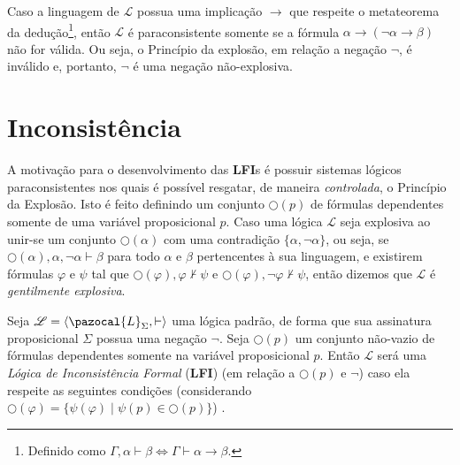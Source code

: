Caso a linguagem de $\mathcal{L}$ possua uma implicação $\rightarrow$ que respeite o metateorema da dedução\footnote{Definido como $\Gamma, \alpha \vdash \beta \Longleftrightarrow \Gamma\vdash \alpha \rightarrow \beta$.}, então $\mathcal{L}$ é paraconsistente somente se a fórmula $\alpha \rightarrow (\neg \alpha \rightarrow \beta)$ não for válida. Ou seja, o Princípio da explosão, em relação a negação $\neg$, é inválido e, portanto, $\neg$ é uma negação não-explosiva.

\section{Inconsistência}
A motivação para o desenvolvimento das \textbf{LFI}s é possuir sistemas lógicos paraconsistentes nos quais é possível resgatar, de maneira \textit{controlada}, o Princípio da Explosão. Isto é feito definindo um conjunto $\bigcirc(p)$ de fórmulas dependentes somente de uma variável proposicional $p$. Caso uma lógica $\mathcal{L}$ seja explosiva ao unir-se um conjunto $\bigcirc(\alpha)$ com uma contradição $\{\alpha, \neg \alpha\}$, ou seja, se $\bigcirc(\alpha), \alpha, \neg \alpha \vdash \beta$ para todo $\alpha$ e $\beta$ pertencentes à sua linguagem, e existirem fórmulas $\varphi$ e $\psi$ tal que $\bigcirc(\varphi), \varphi \nvdash \psi$ e $\bigcirc(\varphi), \neg \varphi \nvdash \psi$, então dizemos que $\mathcal{L}$ é \textit{gentilmente explosiva}. 

\begin{definicao}
    \label{def:lfi}
    Seja $\mathcal{L} = \langle \pazocal{L}_{\Sigma}, \vdash \rangle$ uma lógica padrão, de forma que sua assinatura proposicional $\Sigma$ possua uma negação $\neg$. Seja $\bigcirc(p)$ um conjunto não-vazio de fórmulas dependentes somente na variável proposicional $p$. Então $\mathcal{L}$ será uma \textit{Lógica de Inconsistência Formal} (\textbf{LFI}) (em relação a $\bigcirc(p)$ e $\neg$) caso ela respeite as seguintes condições (considerando $\bigcirc(\varphi) = \{\psi(\varphi) \; | \; \psi(p) \in \bigcirc(p)\}$) .



\end{definicao}


